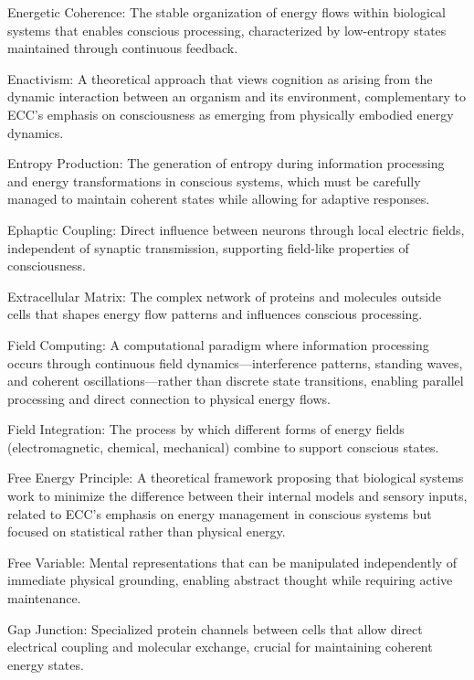 Energetic Coherence: The stable organization of energy flows within biological systems that enables conscious processing, characterized by low-entropy states maintained through continuous feedback.

Enactivism: A theoretical approach that views cognition as arising from the dynamic interaction between an organism and its environment, complementary to ECC's emphasis on consciousness as emerging from physically embodied energy dynamics.

Entropy Production: The generation of entropy during information processing and energy transformations in conscious systems, which must be carefully managed to maintain coherent states while allowing for adaptive responses.

Ephaptic Coupling: Direct influence between neurons through local electric fields, independent of synaptic transmission, supporting field-like properties of consciousness.

Extracellular Matrix: The complex network of proteins and molecules outside cells that shapes energy flow patterns and influences conscious processing.

Field Computing: A computational paradigm where information processing occurs through continuous field dynamics—interference patterns, standing waves, and coherent oscillations—rather than discrete state transitions, enabling parallel processing and direct connection to physical energy flows.

Field Integration: The process by which different forms of energy fields (electromagnetic, chemical, mechanical) combine to support conscious states.

Free Energy Principle: A theoretical framework proposing that biological systems work to minimize the difference between their internal models and sensory inputs, related to ECC's emphasis on energy management in conscious systems but focused on statistical rather than physical energy.

Free Variable: Mental representations that can be manipulated independently of immediate physical grounding, enabling abstract thought while requiring active maintenance.

Gap Junction: Specialized protein channels between cells that allow direct electrical coupling and molecular exchange, crucial for maintaining coherent energy states.

